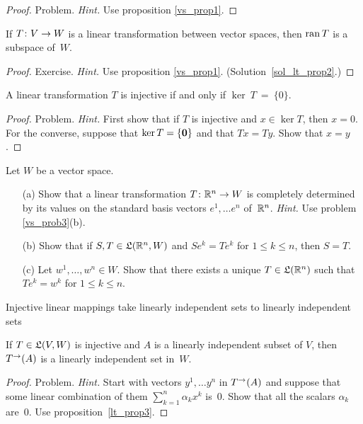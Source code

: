 \begin{proof} Problem.  \emph{Hint.} Use proposition \ref{vs_prop1}. \ns
\end{proof}

\begin{prop}\label{lt_prop2} If $T \colon  V \rightarrow W$ is a linear transformation between vector spaces,
then $\operatorname{ran} T$ is a subspace of~$W$.
\end{prop}

\begin{proof} Exercise.  \emph{Hint.} Use proposition \ref{vs_prop1}.
(Solution~\ref{sol_lt_prop2}.) \ns
\end{proof}

\begin{prop}\label{lt_prop3}  A linear transformation $T$ is injective if and only if $\ker~T~=~\{0\}$.
\end{prop}

\begin{proof} Problem.  \emph{Hint.} First show that if $T$ is injective and $x \in \ker T$, then $x=0$.
For the converse, suppose that $\ker T = \{\mathbf{0}\}$ and that $Tx = Ty$.  Show that $x = y$.
\ns
\end{proof}

\begin{prob}\label{prob_lt_det_bas}  Let $W$ be a vector space.
 \begin{enumerate}
  \item[(a)] Show that a linear transformation $T \colon  \mathbb{R}^n \rightarrow W$ is
completely determined by its values on the standard basis vectors
$e^1, \dots e^n$ of~$\mathbb{R}^n$.  \emph{Hint.} Use problem
\ref{vs_prob3}(b).
  \item[(b)]  Show that if $S,T \in \mathfrak{L}(\mathbb{R}^n, W)$ and $Se^k =
Te^k$ for $1 \le k \le n$, then $S = T$.
  \item[(c)]  Let $w^1, \dots, w^n \in W$.  Show that there exists a
unique $T \in \mathfrak{L}(\mathbb{R}^n)$ such that $Te^k = w^k$ for $1 \le k
\le n$.
 \end{enumerate}
\end{prob}

Injective linear mappings take linearly independent sets to linearly independent sets

\begin{prop}  If $T \in \mathfrak{L}(V,W)$ is injective and $A$ is a linearly independent subset of $V$,
then $T^\rightarrow(A)$ is a linearly independent set in~$W$.
\end{prop}

\begin{proof} Problem.  \emph{Hint.}  Start with vectors $y^1, \dots y^n$ in $T^\rightarrow(A)$ and suppose
that some linear combination of them $\sum_{k=1}^n \alpha_kx^k$ is~$0$.  Show that all the
scalars $\alpha_k$ are~$0$.  Use proposition~\ref{lt_prop3}.  \ns
\end{proof}

